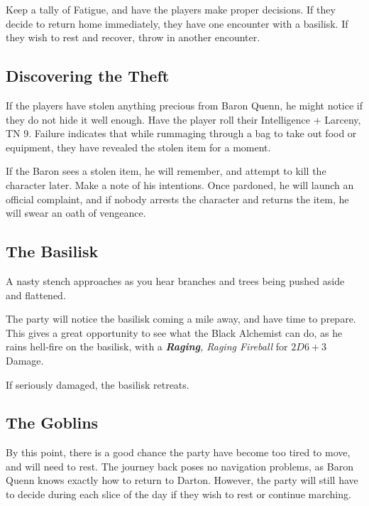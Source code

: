 \begin{multicols}{2}

\noindent
Keep a tally of Fatigue, and have the players make proper decisions.
If they decide to return home immediately, they have one encounter with a basilisk.
If they wish to rest and recover, throw in another encounter.

\subsection{Discovering the Theft}

If the players have stolen anything precious from Baron Quenn, he might notice if they do not hide it well enough.
Have the player roll their Intelligence + Larceny, TN 9.
Failure indicates that while rummaging through a bag to take out food or equipment, they have revealed the stolen item for a moment.

If the Baron sees a stolen item, he will remember, and attempt to kill the character later.
Make a note of his intentions.
Once pardoned, he will launch an official complaint, and if nobody arrests the character and returns the item, he will swear an oath of vengeance.

\subsection{The Basilisk}

\begin{boxtext}

	A nasty stench approaches as you hear branches and trees being pushed aside and flattened.

\end{boxtext}

The party will notice the basilisk coming a mile away, and have time to prepare.
This gives a great opportunity to see what the Black Alchemist can do, as he rains hell-fire on the basilisk, with a \textit{\textbf{Raging}, Raging Fireball} for $2D6+3$ Damage.

\basilisk

If seriously damaged, the basilisk retreats.

\subsection{The Goblins}

By this point, there is a good chance the party have become too tired to move, and will need to rest.
The journey back poses no navigation problems, as Baron Quenn knows exactly how to return to Darton.
However, the party will still have to decide during each slice of the day if they wish to rest or continue marching.

\end{multicols}
